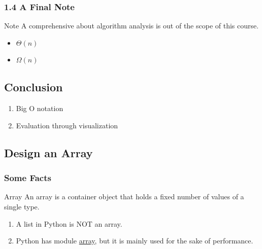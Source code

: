 \documentclass[aspectratio=169, 14pt]{beamer}
\begin{document}
\begin{frame}
	\frametitle{1.4 A Final Note}
	\begin{alertblock}{Note}
		A comprehensive about algorithm analysis is out of the scope of this course.
	\end{alertblock}

	\begin{itemize}
		\item $\Theta(n)$
		\item $\Omega(n)$
	\end{itemize}

\end{frame}


\begin{frame}
	\section{\textcolor{darkmidnightblue}{Conclusion}}

	\begin{enumerate}
		\item Big O notation
		\item Evaluation through visualization
	\end{enumerate}
\end{frame}

{
\begin{frame}
	\section{\textcolor{darkmidnightblue}{Design an Array}}
\end{frame}
}

\begin{frame}
	\frametitle{Some Facts}
	\begin{exampleblock}{Array}
		An array is a container object that holds a fixed number of values of a single type.
	\end{exampleblock}
	\begin{enumerate}
		\item A list in Python is NOT an array.
		\item Python has module \href{https://docs.python.org/3/library/array.html}{array}, but it is mainly used for the sake of performance.
	\end{enumerate}
\end{frame}
\end{document}

